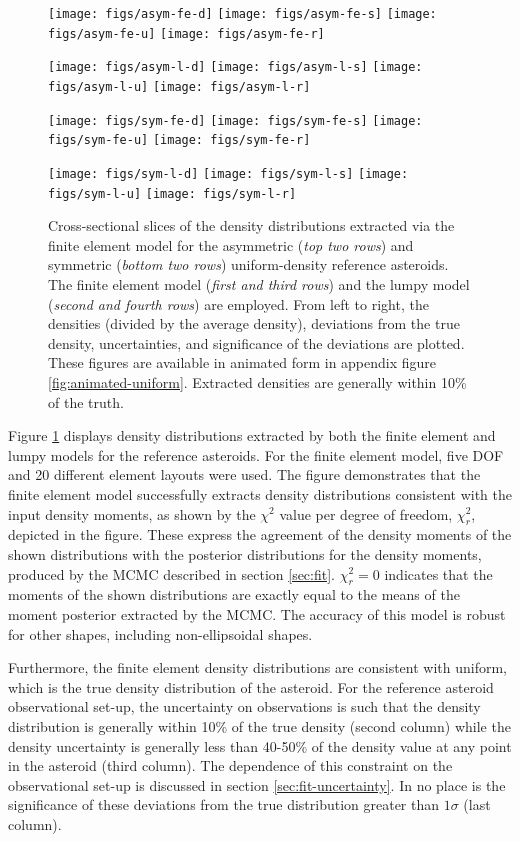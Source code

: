 \documentclass[fleqn,usenatbib]{mnras}
\begin{document}
\begin{figure}
  \texttt{[image: figs/asym-fe-d]}\hfill
  \texttt{[image: figs/asym-fe-s]}\hfill
  \texttt{[image: figs/asym-fe-u]}\hfill
  \texttt{[image: figs/asym-fe-r]}

  \texttt{[image: figs/asym-l-d]}\hfill
  \texttt{[image: figs/asym-l-s]}\hfill
  \texttt{[image: figs/asym-l-u]}\hfill
  \texttt{[image: figs/asym-l-r]}

  \texttt{[image: figs/sym-fe-d]}\hfill
  \texttt{[image: figs/sym-fe-s]}\hfill
  \texttt{[image: figs/sym-fe-u]}\hfill
  \texttt{[image: figs/sym-fe-r]}

  \texttt{[image: figs/sym-l-d]}\hfill
  \texttt{[image: figs/sym-l-s]}\hfill
  \texttt{[image: figs/sym-l-u]}\hfill
  \texttt{[image: figs/sym-l-r]}

  \caption{Cross-sectional slices of the density distributions extracted via the finite element model for the asymmetric (\textit{top two rows}) and symmetric (\textit{bottom two rows}) uniform-density reference asteroids. The finite element model (\textit{first and third rows}) and the lumpy model (\textit{second and fourth rows}) are employed. From left to right, the densities (divided by the average density), deviations from the true density, uncertainties, and significance of the deviations are plotted. These figures are available in animated form in appendix figure \ref{fig:animated-uniform}. Extracted densities are generally within 10\% of the truth.}
  \label{fig:den-uniform}
\end{figure}

Figure \ref{fig:den-uniform} displays density distributions extracted by both the finite element and lumpy models for the reference asteroids. For the finite element model, five DOF and 20 different element layouts were used. The figure demonstrates that the finite element model successfully extracts density distributions consistent with the input density moments, as shown by the $\chi^2$ value per degree of freedom, $\chi^2_r$, depicted in the figure. These express the agreement of the density moments of the shown distributions with the posterior distributions for the density moments, produced by the MCMC described in section \ref{sec:fit}. $\chi^2_r = 0$ indicates that the moments of the shown distributions are exactly equal to the means of the moment posterior extracted by the MCMC. The accuracy of this model is robust for other shapes, including non-ellipsoidal shapes.

Furthermore, the finite element density distributions are consistent with uniform, which is the true density distribution of the asteroid. For the reference asteroid observational set-up, the uncertainty on observations is such that the density distribution is generally within 10\% of the true density (second column) while the density uncertainty is generally less than 40-50\% of the density value at any point in the asteroid (third column). The dependence of this constraint on the observational set-up is discussed in section \ref{sec:fit-uncertainty}. In no place is the significance of these deviations from the true distribution greater than $1 \sigma$ (last column).
\end{document}
